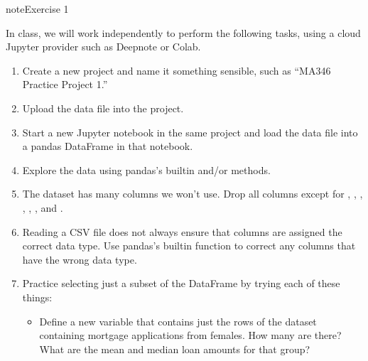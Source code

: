 \documentclass[letterpaper,10pt,english]{jupyterBook}
\begin{document}
\begin{sphinxadmonition}{note}{Exercise 1}

\sphinxAtStartPar
In class, we will work independently to perform the following tasks, using a cloud Jupyter provider such as Deepnote or Colab.
\begin{enumerate}
%
\item {} 
\sphinxAtStartPar
Create a new project and name it something sensible, such as “MA346 Practice Project 1.”

\item {} 
\sphinxAtStartPar
Upload the data file into the project.

\item {} 
\sphinxAtStartPar
Start a new Jupyter notebook in the same project and load the data file into a pandas DataFrame in that notebook.

\item {} 
\sphinxAtStartPar
Explore the data using pandas’s built\sphinxhyphen{}in  and/or  methods.

\item {} 
\sphinxAtStartPar
The dataset has many columns we won’t use.  Drop all columns except for , , , , , , and .

\item {} 
\sphinxAtStartPar
Reading a CSV file does not always ensure that columns are assigned the correct data type.  Use pandas’s built\sphinxhyphen{}in  function to correct any columns that have the wrong data type.

\item {} 
\sphinxAtStartPar
Practice selecting just a subset of the DataFrame by trying each of these things:
\begin{itemize}
\item {} 
\sphinxAtStartPar
Define a new variable  that contains just the rows of the dataset containing mortgage applications from females.  How many are there?  What are the mean and median loan amounts for that group?


\end{itemize}
\end{enumerate}
\end{sphinxadmonition}
\end{document}
